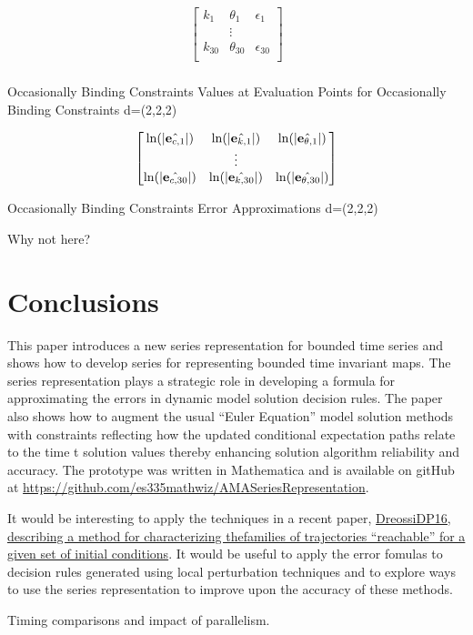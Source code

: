 \documentclass[12pt]{article}
\begin{document}
\begin{table}
  \centering
  
\begin{gather*}
  \begin{bmatrix}
    k_1&\theta_1&\epsilon_1\\
&\vdots\\
    k_{30}&\theta_{30}&\epsilon_{30}\\
  \end{bmatrix}\\
% 
\end{gather*}

  \caption{Occasionally Binding Constraints Values at Evaluation Points for Occasionally Binding Constraints \label{valatobcB}  d=(2,2,2)}
\end{table}


 \begin{table}
   \centering

   \begin{gather*}
\forEstErr\\
%   
   \end{gather*}
   \caption{Occasionally Binding Constraints Error Approximations\label{esterrobcB}  d=(2,2,2)}
 \end{table}

Why not here?



\clearpage
\section{Conclusions}
This paper introduces a new series representation for bounded time series and
shows how to develop  series for representing bounded time invariant maps.
The series representation plays a strategic role in developing a formula 
for approximating the errors in dynamic model solution decision rules. 
 The paper
also shows how to  augment the usual ``Euler Equation'' model solution
methods with constraints reflecting how the updated
conditional expectation paths relate to the time t solution values thereby
enhancing solution algorithm reliability and accuracy.
The prototype was written in Mathematica and is available on gitHub
at \href{https://github.com/es335mathwiz/AMASeriesRepresentation}{https://github.com/es335mathwiz/AMASeriesRepresentation}.

{\color{blue}
It would be interesting to apply the techniques in a recent paper, \href{https://github.com/dreossi/sapo}{DreossiDP16, describing a method for characterizing thefamilies of trajectories ``reachable'' for a given set of initial conditions}.
It would be useful to apply the error fomulas to decision rules generated
using local perturbation techniques and to explore ways to use the series
representation to improve upon the accuracy of these methods.

Timing comparisons and impact of parallelism.
}
\newpage
\end{document}
